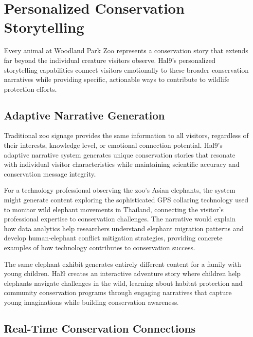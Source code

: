 \documentclass[
  Letterpaper,
]{scrbook}
\begin{document}
\section{Personalized Conservation
Storytelling}\label{personalized-conservation-storytelling-1}

Every animal at Woodland Park Zoo represents a conservation story that
extends far beyond the individual creature visitors observe. Hal9's
personalized storytelling capabilities connect visitors emotionally to
these broader conservation narratives while providing specific,
actionable ways to contribute to wildlife protection efforts.

\subsection{Adaptive Narrative
Generation}\label{adaptive-narrative-generation}

Traditional zoo signage provides the same information to all visitors,
regardless of their interests, knowledge level, or emotional connection
potential. Hal9's adaptive narrative system generates unique
conservation stories that resonate with individual visitor
characteristics while maintaining scientific accuracy and conservation
message integrity.

For a technology professional observing the zoo's Asian elephants, the
system might generate content exploring the sophisticated GPS collaring
technology used to monitor wild elephant movements in Thailand,
connecting the visitor's professional expertise to conservation
challenges. The narrative would explain how data analytics help
researchers understand elephant migration patterns and develop
human-elephant conflict mitigation strategies, providing concrete
examples of how technology contributes to conservation success.

The same elephant exhibit generates entirely different content for a
family with young children. Hal9 creates an interactive adventure story
where children help elephants navigate challenges in the wild, learning
about habitat protection and community conservation programs through
engaging narratives that capture young imaginations while building
conservation awareness.

\subsection{Real-Time Conservation
Connections}\label{real-time-conservation-connections}
\end{document}
